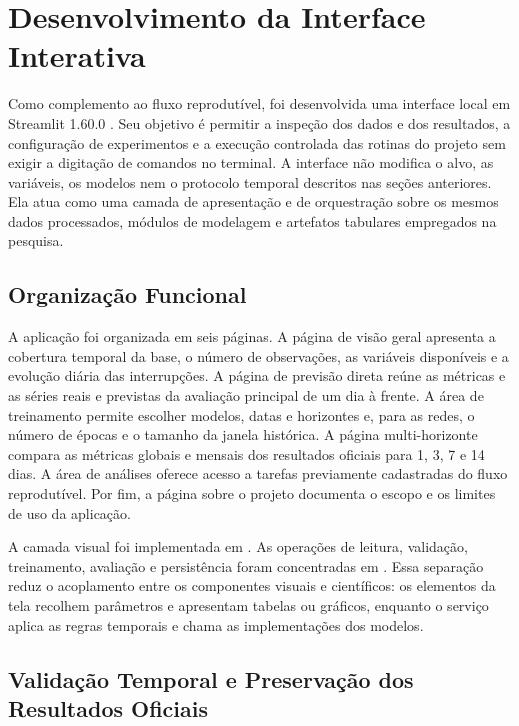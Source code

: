 \section{Desenvolvimento da Interface Interativa}\label{sec:metodologia_interface}

Como complemento ao fluxo reprodutível, foi desenvolvida uma interface local em Streamlit 1.60.0 \cite{streamlit2026}. Seu objetivo é permitir a inspeção dos dados e dos resultados, a configuração de experimentos e a execução controlada das rotinas do projeto sem exigir a digitação de comandos no terminal. A interface não modifica o alvo, as variáveis, os modelos nem o protocolo temporal descritos nas seções anteriores. Ela atua como uma camada de apresentação e de orquestração sobre os mesmos dados processados, módulos de modelagem e artefatos tabulares empregados na pesquisa.

\subsection{Organização Funcional}

A aplicação foi organizada em seis páginas. A página de visão geral apresenta a cobertura temporal da base, o número de observações, as variáveis disponíveis e a evolução diária das interrupções. A página de previsão direta reúne as métricas e as séries reais e previstas da avaliação principal de um dia à frente. A área de treinamento permite escolher modelos, datas e horizontes e, para as redes, o número de épocas e o tamanho da janela histórica. A página multi-horizonte compara as métricas globais e mensais dos resultados oficiais para 1, 3, 7 e 14 dias. A área de análises oferece acesso a tarefas previamente cadastradas do fluxo reprodutível. Por fim, a página sobre o projeto documenta o escopo e os limites de uso da aplicação.

A camada visual foi implementada em . As operações de leitura, validação, treinamento, avaliação e persistência foram concentradas em . Essa separação reduz o acoplamento entre os componentes visuais e científicos: os elementos da tela recolhem parâmetros e apresentam tabelas ou gráficos, enquanto o serviço aplica as regras temporais e chama as implementações dos modelos.

\subsection{Validação Temporal e Preservação dos Resultados Oficiais}

